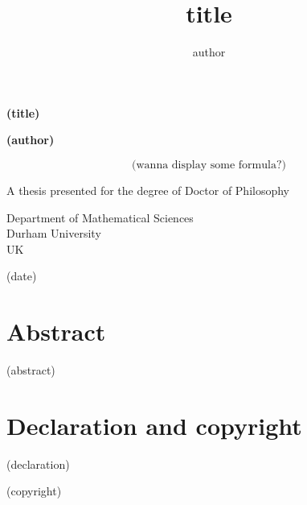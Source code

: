 \documentclass[12pt]{report}
\theoremstyle{definition}
\begin{document}
\title{title}
\author{author}







\begin{titlepage}
\begin{center}
\vspace*{10mm}

\textbf{\huge (title)}

\vspace{20mm}

\textbf{\Large (author)}


\vfill

{\Large
\begin{equation*}
\text{(wanna display some formula?)}
\end{equation*}
}

\vspace{10mm}

{\small 
A thesis presented for the degree of
Doctor of Philosophy

\vspace{10mm}

Department of Mathematical Sciences\\
Durham University\\
UK\\
\vspace{10mm}

(date)
}


\end{center}
\end{titlepage}








\section*{\center Abstract}

(abstract)


\newpage




\section*{Declaration and copyright}

(declaration)

\vspace{2mm}\noindent (copyright)
\end{document}
